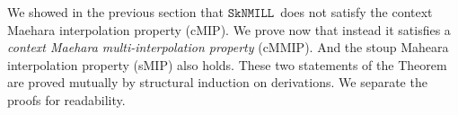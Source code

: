 \documentclass[sn-mathphys-num]{sn-jnl}%
\newcommand{\GG}{\Gamma}
\newcommand{\GD}{\Delta}
\newcommand{\vd}{\vdash}
\newcommand{\SkNMILL}{$\mathtt{SkNMILL}$}
\newcommand{\mf}[1]{\mathsf{#1}}
\newcommand{\gs}[1]{\sigma_{X} (#1)}
\newcommand{\sMIP}{\textsf{sMIP}}
\newcommand{\cMIP}{\textsf{cMIP}}
\newcommand{\cMMIP}{\textsf{cMMIP}}
\theoremstyle{thmstyleone}%
\newtheorem{theorem}{Theorem}%
\theoremstyle{thmstyletwo}%
\theoremstyle{thmstylethree}%
\begin{document}
We showed in the previous section that \SkNMILL~does not satisfy the context Maehara interpolation property (\cMIP). 
We prove now that instead it satisfies a \emph{context Maehara multi-interpolation property} (\cMMIP).
And the stoup Maheara interpolation property (\sMIP) also holds.
\genIntrp
These two statements of the Theorem are proved mutually by structural induction on derivations.
We separate the proofs for readability.
\end{document}
